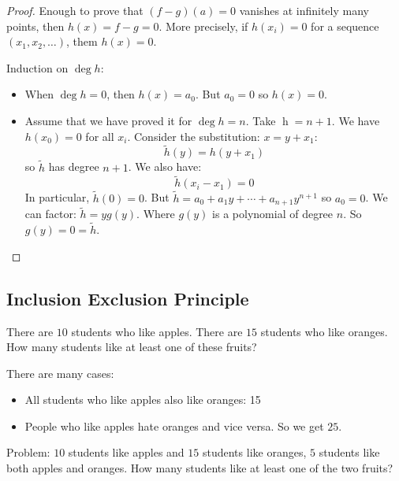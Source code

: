 \documentclass{report}
\begin{document}
\begin{proof}
    Enough to prove that $(f - g)(a) = 0$ vanishes at infinitely many points, then $h(x) = f - g = 0$. More precisely, if $h(x_{i}) = 0$ for a sequence $(x_{1}, x_{2}, \ldots )$, them $h(x) = 0$.

    Induction on $\mathop{deg}h$:
        \begin{itemize}
            \item When $\mathop{deg}h = 0$, then $h(x) = a_{0}$. But $a_{0} = 0$ so $h(x) = 0$.

            \item Assume that we have proved it for $\mathop{deg}h = n$. Take $\mathop{h} = n + 1$. We have $h(x_{0}) = 0$ for all $x_{i}$. Consider the substitution: $x = y + x_{1}$:
                \begin{equation*}
                    \tilde{h}(y) = h(y + x_{1})
                \end{equation*}
            so $\tilde{h}$ has degree $n + 1$. We also have:
                \begin{equation*}
                    \tilde{h}(x_{i} - x_{1}) = 0
                \end{equation*}
            In particular, $\tilde{h}(0) = 0$. But $\tilde{h} = a_{0} + a_{1}y + \cdots  + a_{n + 1}y^{n + 1}$ so $a_{0} = 0$. We can factor: $\tilde{h} = yg(y)$. Where $g(y)$ is a polynomial of degree $n$. So $g(y) = 0 = \tilde{h}$.
        \end{itemize}
\end{proof}

\begin{topic}
    \section{Inclusion Exclusion Principle}
\end{topic}

There are $10$ students who like apples. There are $15$ students who like oranges. How many students like at least one of these fruits?

There are many cases:
    \begin{itemize}
        \item All students who like apples also like oranges: 15

        \item People who like apples hate oranges and vice versa. So we get $25$. 
    \end{itemize}
Problem: $10$ students like apples and $15$ students like oranges, $5$ students like both apples and oranges. How many students like at least one of the two fruits?
\end{document}

